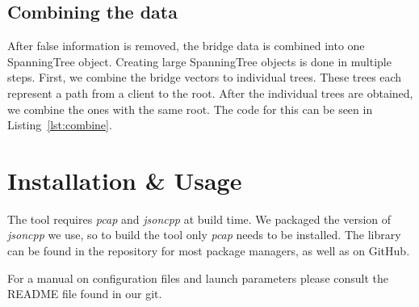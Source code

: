 \subsection{Combining the data}
\label{combining_data}
After false information is removed, the bridge data is combined into one SpanningTree object.
Creating large SpanningTree objects is done in multiple steps.
First, we combine the bridge vectors to individual trees.
These trees each represent a path from a client to the root.
After the individual trees are obtained, we combine the ones with the same root.
The code for this can be seen in Listing~\ref{lst:combine}.


\section{Installation \& Usage}
The tool requires \textit{pcap} and \textit{jsoncpp} at build time.
We packaged the version of \textit{jsoncpp} we use, so to build the tool only \textit{pcap} needs to be installed.
The library can be found in the repository for most package managers, as well as on GitHub\cite{tcpdump_git}.

For a manual on configuration files and launch parameters please consult the README file found in our git\cite{stp_git}.
